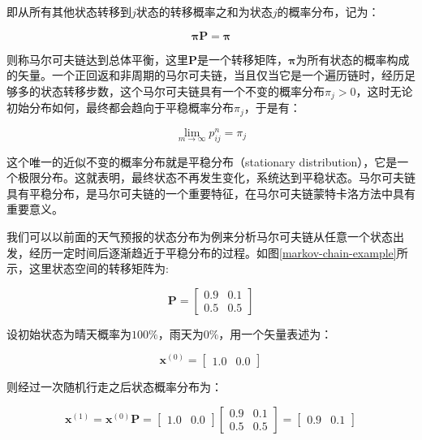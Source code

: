 \noindent 即从所有其他状态转移到$j$状态的转移概率之和为状态$j$的概率分布，记为：

\begin{equation}
	\mathbf{\pi} \mathbf{P}=\mathbf{\pi}
\end{equation}

\noindent 则称马尔可夫链达到总体平衡，这里$\mathbf{P}$是一个转移矩阵，$\mathbf{\pi}$为所有状态的概率构成的矢量。一个正回返和非周期的马尔可夫链，当且仅当它是一个遍历链时，经历足够多的状态转移步数，这个马尔可夫链具有一个不变的概率分布$\pi_j>0$，这时无论初始分布如何，最终都会趋向于平稳概率分布$\pi_j$，于是有：

\begin{equation}
	\lim_{m\rightarrow \infty}p^{n}_{ij}=\pi_j
\end{equation}

这个唯一的近似不变的概率分布就是平稳分布（stationary distribution），它是一个极限分布。这就表明，最终状态不再发生变化，系统达到平稳状态。马尔可夫链具有平稳分布，是马尔可夫链的一个重要特征，在马尔可夫链蒙特卡洛方法中具有重要意义。

我们可以以前面的天气预报的状态分布为例来分析马尔可夫链从任意一个状态出发，经历一定时间后逐渐趋近于平稳分布的过程。如图\ref{markov-chain-example}所示，这里状态空间的转移矩阵为:

\begin{equation}
	\mathbf{P}=\begin{bmatrix}
		0.9 & 0.1\\0.5 & 0.5
	\end{bmatrix}
\end{equation}

\noindent 设初始状态为晴天概率为$100\%$，雨天为$0\%$，用一个矢量表述为：

\begin{equation}
	\mathbf{x}^{(0)}=\begin{bmatrix}
		1.0&0.0
	\end{bmatrix}
\end{equation}

\noindent 则经过一次随机行走之后状态概率分布为：

\begin{equation}
	\mathbf{x}^{(1)}=\mathbf{x}^{(0)}\mathbf{P}=\begin{bmatrix}
		1.0&0.0 
	\end{bmatrix}\begin{bmatrix}
		0.9&0.1\\0.5&0.5
	\end{bmatrix}=\begin{bmatrix}
		0.9&0.1
	\end{bmatrix}
\end{equation}

